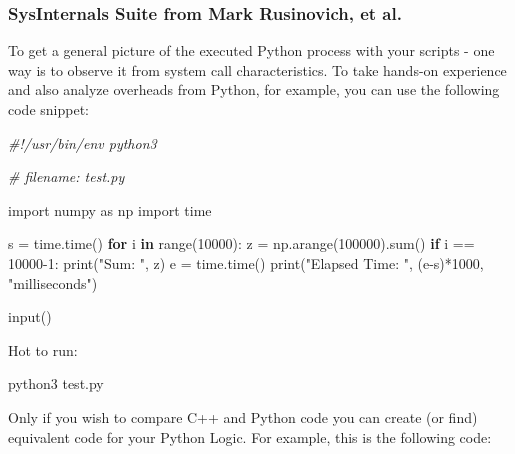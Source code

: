 \documentclass[
]{article}
\newenvironment{Shaded}{}{}
\newcommand{\BuiltInTok}[1]{#1}
\newcommand{\CommentTok}[1]{\textcolor[rgb]{0.38,0.63,0.69}{\textit{#1}}}
\newcommand{\ControlFlowTok}[1]{\textcolor[rgb]{0.00,0.44,0.13}{\textbf{#1}}}
\newcommand{\DecValTok}[1]{\textcolor[rgb]{0.25,0.63,0.44}{#1}}
\newcommand{\ExtensionTok}[1]{#1}
\newcommand{\ImportTok}[1]{#1}
\newcommand{\KeywordTok}[1]{\textcolor[rgb]{0.00,0.44,0.13}{\textbf{#1}}}
\newcommand{\NormalTok}[1]{#1}
\newcommand{\OperatorTok}[1]{\textcolor[rgb]{0.40,0.40,0.40}{#1}}
\newcommand{\StringTok}[1]{\textcolor[rgb]{0.25,0.44,0.63}{#1}}
\begin{document}
\hypertarget{sysinternals-suite-from-mark-rusinovich-et-al}{%
\subsubsection{SysInternals Suite from Mark Rusinovich, et
al.}\label{sysinternals-suite-from-mark-rusinovich-et-al}}

To get a general picture of the executed Python process with your
scripts - one way is to observe it from system call characteristics. To
take hands-on experience and also analyze overheads from Python, for
example, you can use the following code snippet:

\begin{Shaded}
\begin{Highlighting}[]
\CommentTok{\#!/usr/bin/env python3}

\CommentTok{\# filename: test.py}

\ImportTok{import}\NormalTok{ numpy }\ImportTok{as}\NormalTok{ np}
\ImportTok{import}\NormalTok{ time}

\NormalTok{s }\OperatorTok{=}\NormalTok{ time.time()}
\ControlFlowTok{for}\NormalTok{ i }\KeywordTok{in} \BuiltInTok{range}\NormalTok{(}\DecValTok{10000}\NormalTok{):}
\NormalTok{    z }\OperatorTok{=}\NormalTok{ np.arange(}\DecValTok{100000}\NormalTok{).}\BuiltInTok{sum}\NormalTok{()}
    \ControlFlowTok{if}\NormalTok{ i }\OperatorTok{==} \DecValTok{10000}\OperatorTok{{-}}\DecValTok{1}\NormalTok{:}
        \BuiltInTok{print}\NormalTok{(}\StringTok{"Sum: "}\NormalTok{, z)}
\NormalTok{e }\OperatorTok{=}\NormalTok{ time.time()}
\BuiltInTok{print}\NormalTok{(}\StringTok{"Elapsed Time: "}\NormalTok{, (e}\OperatorTok{{-}}\NormalTok{s)}\OperatorTok{*}\DecValTok{1000}\NormalTok{, }\StringTok{"milliseconds"}\NormalTok{)}

\BuiltInTok{input}\NormalTok{()}
\end{Highlighting}
\end{Shaded}

Hot to run:

\begin{Shaded}
\begin{Highlighting}[]
\ExtensionTok{python3}\NormalTok{ test.py}
\end{Highlighting}
\end{Shaded}

Only if you wish to compare C++ and Python code you can create (or find)
equivalent code for your Python Logic. For example, this is the
following code:
\end{document}
